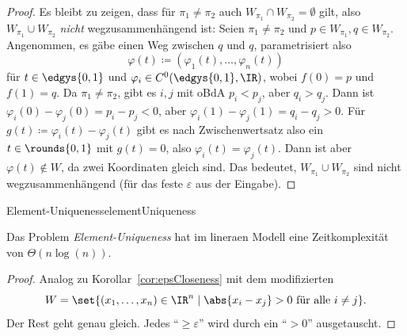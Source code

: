 \documentclass[language=ngerman,algolist,acrolist]{TemplateLecture}
\begin{document}
\begin{proof}
    Es bleibt zu zeigen, dass für $\pi_1 \neq \pi_2$ auch $W_{\pi_1} \cap W_{\pi_2} = \emptyset$ gilt, also $W_{\pi_1} \cup W_{\pi_2}$ \emph{nicht} wegzusammenhängend ist: Seien $\pi_1 \neq \pi_2$ und $p \in W_{\pi_1}, q \in W_{\pi_2}$. Angenommen, es gäbe einen Weg zwischen $q$ und $q$, parametrisiert also 
    \begin{equation*}
        \varphi(t) \coloneqq \left( \varphi_1(t), \ldots, \varphi_n(t) \right)
    \end{equation*}
    für $t \in \edgys{0,1}$ und $\varphi_i \in C^0(\edgys{0,1}, \IR)$, wobei $f(0) = p$ und $f(1) = q$. Da $\pi_1 \neq \pi_2$, gibt es $i, j$ mit oBdA $p_i < p_j$, aber $q_i > q_j$. Dann ist $\varphi_i(0) - \varphi_j(0) = p_i - p_j < 0$, aber $\varphi_i(1) - \varphi_j(1) = q_i - q_j > 0$. Für $g(t) \coloneqq \varphi_i(t) - \varphi_j(t)$ gibt es nach Zwischenwertsatz also ein $t \in \rounds{0,1}$ mit $g(t) = 0$, also $\varphi_i(t) = \varphi_j(t)$. Dann ist aber $\varphi(t) \notin W$, da zwei Koordinaten gleich sind. Das bedeutet, $W_{\pi_1} \cup W_{\pi_2}$ sind nicht wegzusammenhängend (für das feste $\varepsilon$ aus der Eingabe).
\end{proof}

\begin{prob}{Element-Uniqueness}{elementUniqueness}
\end{prob}

\begin{cor}
    Das Problem \emph{Element-Uniqueness} hat im lineraen Modell eine Zeitkomplexität von $\Theta(n \log(n))$.
\end{cor}
\begin{proof}
    Analog zu Korollar~\ref{cor:epsCloseness} mit dem modifizierten 
    \begin{equation*}
        W = \set{(x_1, \ldots, x_n) \in \IR^n \mid \abs{x_i - x_j} > 0 \text{ für alle }i \neq j}.
    \end{equation*}
    Der Rest geht genau gleich. Jedes \enquote{$\geq \varepsilon$} wird durch ein \enquote{$> 0$} ausgetauscht.
\end{proof}
\end{document}
